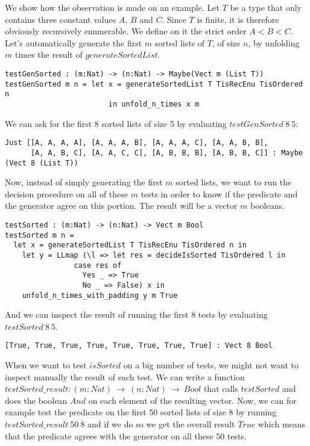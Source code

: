 We show how the observation is made on an example. Let $T$ be a type that only contains three constant values $A$, $B$ and $C$. Since $T$ is finite, it is therefore obviously recursively enumerable. We define on it the strict order $A < B < C$.
Let's automatically generate the first $m$ sorted lists of $T$, of size $n$, by unfolding $m$ times the result of $generateSortedList$.


\begin{lstlisting}
testGenSorted : (m:Nat) -> (n:Nat) -> Maybe(Vect m (List T))
testGenSorted m n = let x = generateSortedList T TisRecEnu TisOrdered n 
                        in unfold_n_times x m
\end{lstlisting}
We can ask for the first 8 sorted lists of size 5 by evaluating $testGenSorted\ 8\ 5$:

\begin{lstlisting}
Just [[A, A, A, A], [A, A, A, B], [A, A, A, C], [A, A, B, B],
      [A, A, B, C], [A, A, C, C], [A, B, B, B], [A, B, B, C]] : Maybe (Vect 8 (List T))
\end{lstlisting}
Now, instead of simply generating the first $m$ sorted lists, we want to run the decision procedure on all of these $m$ tests in order to know if the predicate and the generator agree on this portion. The result will be a vector $m$ booleans.

\begin{lstlisting}
testSorted : (m:Nat) -> (n:Nat) -> Vect m Bool
testSorted m n = 
  let x = generateSortedList T TisRecEnu TisOrdered n in
    let y = LLmap (\l => let res = decideIsSorted TisOrdered l in
			    case res of
			      Yes _ => True
			      No _ => False) x in
	unfold_n_times_with_padding y m True
\end{lstlisting}
And we can inspect the result of running the first 8 tests by evaluating $testSorted\ 8\ 5$.

\begin{lstlisting}
[True, True, True, True, True, True, True, True] : Vect 8 Bool
\end{lstlisting}
When we want to test $isSorted$ on a big number of tests, we might not want to inspect manually the result of each test. We can write a function $testSorted\_result : (m:Nat)\ \rightarrow\ (n:Nat)\ \rightarrow\ Bool$ that calls $testSorted$ and does the boolean $And$ on each element of the resulting vector. Now, we can for example test the predicate on the first 50 sorted lists of size 8 by running $testSorted\_result\ 50\ 8$ and if we do so we get the overall result $True$ which means that the predicate agrees with the generator on all these 50 tests.


